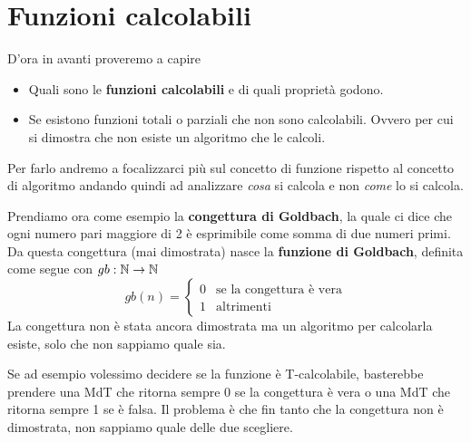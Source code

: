 \section{Funzioni calcolabili}
D'ora in avanti proveremo a capire
\begin{itemize}
	\item Quali sono le \textbf{funzioni calcolabili} e di
	      quali proprietà godono.
	\item Se esistono funzioni totali o parziali che non sono
	      calcolabili. Ovvero per cui si dimostra che non esiste
	      un algoritmo che le calcoli.
\end{itemize}
Per farlo andremo a focalizzarci più sul concetto di funzione
rispetto al concetto di algoritmo andando quindi ad analizzare
\emph{cosa} si calcola e non \emph{come} lo si calcola.

\begin{example}
	Prendiamo ora come esempio la
	\textbf{congettura di Goldbach}, la quale ci dice che ogni
	numero pari maggiore di 2 è esprimibile come somma di due
	numeri primi. Da questa congettura (mai dimostrata) nasce
	la \textbf{funzione di Goldbach}, definita come segue con
	$gb : \mathbb{N} \to \mathbb{N}$
	\[
		gb(n) = \begin{cases}
			0 & \text{se la congettura è vera} \\
			1 & \text{altrimenti}
		\end{cases}
	\]
	La congettura non è stata ancora dimostrata ma un algoritmo
	per calcolarla esiste, solo che non sappiamo quale sia.

	Se ad esempio volessimo decidere se la funzione è
	T-calcolabile, basterebbe prendere una MdT che ritorna
	sempre 0 se la congettura è vera o una MdT che ritorna
	sempre 1 se è falsa. Il problema è che fin tanto che la
	congettura non è dimostrata, non sappiamo quale delle due
	scegliere.
\end{example}

